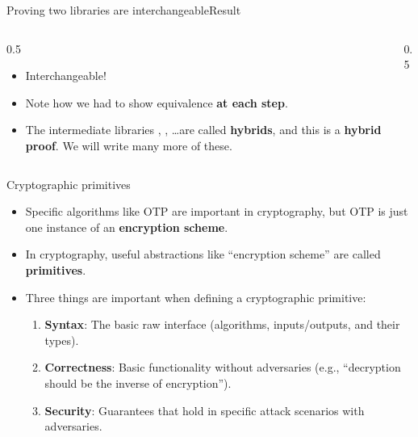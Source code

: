 \ifdefined\PRESENTATION\else\PassOptionsToClass{handout}{beamer}\fi\documentclass[aspectratio=169, lualatex]{beamer}
\begin{document}
\begin{frame}{Proving two libraries are interchangeable}{Result}
	\begin{columns}[c]
		\begin{column}{0.5\textwidth}
			\begin{itemize}
				\item Interchangeable!
				\item Note how we had to show equivalence \textbf{at each step}.
				\item The intermediate libraries , , \ldots are called \textbf{hybrids}, and this is a \textbf{hybrid proof}. We will write many more of these.
			\end{itemize}
		\end{column}
		\begin{column}{0.5\textwidth}
			\begin{center}
			\end{center}
		\end{column}
	\end{columns}
\end{frame}

\begin{frame}{Cryptographic primitives}
	\begin{itemize}
		\item Specific algorithms like OTP are important in cryptography, but OTP is just one instance of an \textbf{encryption scheme}.
		\item In cryptography, useful abstractions like ``encryption scheme'' are called \textbf{primitives}.
		\item Three things are important when defining a cryptographic primitive:
		      \begin{enumerate}
			      \item \textbf{Syntax}: The basic raw interface (algorithms, inputs/outputs, and their types).
			      \item \textbf{Correctness}: Basic functionality without adversaries (e.g., ``decryption should be the inverse of encryption'').
			      \item \textbf{Security}: Guarantees that hold in specific attack scenarios with adversaries.
		      \end{enumerate}
	\end{itemize}
\end{frame}
\end{document}
